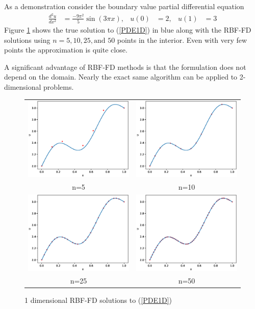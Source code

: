 \documentclass[12pt]{article}
\begin{document}
As a demonstration consider the boundary value partial differential equation
\begin{align}
	\frac{d^2u}{dx^2} &= \frac{-9\pi^2}{5}\sin(3\pi x), & u(0)&=2, & u(1)&=3 \label{PDE1D}
\end{align}
Figure \ref{1Dsolutions} shows the true solution to (\ref{PDE1D}) in blue along with the RBF-FD solutions using $n=5,10,25, \text{and } 50$ points in the interior. Even with very few points the approximation is quite close. \bigbreak

A significant advantage of RBF-FD methods is that the formulation does not depend on the domain. Nearly the exact same algorithm can be applied to 2-dimensional problems. \bigbreak

\begin{figure}[ht]
	\caption{1 dimensional RBF-FD solutions to (\ref{PDE1D})}
	\begin{tabular}{cc}
		\includegraphics[width=.4\textwidth]{1D_n5} & \includegraphics[width=.4\textwidth]{1D_n10} \\
		n=5 & n=10 \\
		\includegraphics[width=.4\textwidth]{1D_n25} & \includegraphics[width=.4\textwidth]{1D_n50} \\
		n=25 & n=50
	\end{tabular}
	\label{1Dsolutions}
	\centering
\end{figure}
\end{document}
